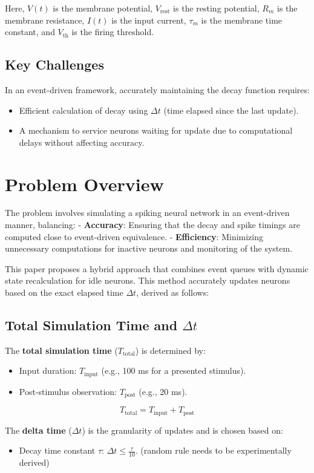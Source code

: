 \documentclass[journal]{IEEEtran}
\begin{document}
Here, $V(t)$ is the membrane potential, $V_{\text{rest}}$ is the resting potential, $R_m$ is the membrane resistance, $I(t)$ is the input current, $\tau_m$ is the membrane time constant, and $V_{\text{th}}$ is the firing threshold.

\subsection{Key Challenges}
In an event-driven framework, accurately maintaining the decay function requires:
\begin{itemize}
    \item Efficient calculation of decay using $\Delta t$ (time elapsed since the last update).
    \item A mechanism to service neurons waiting for update due to computational delays without affecting accuracy.
\end{itemize}

\section{Problem Overview}
The problem involves simulating a spiking neural network in an event-driven manner, balancing:
- \textbf{Accuracy}: Ensuring that the decay and spike timings are computed close to event-driven equivalence.
- \textbf{Efficiency}: Minimizing unnecessary computations for inactive neurons and monitoring of the system.

This paper proposes a hybrid approach that combines event queues with dynamic state recalculation for idle neurons. This method accurately updates neurons based on the exact elapsed time $\Delta t$, derived as follows:

\subsection{Total Simulation Time and $\Delta t$}

The \textbf{total simulation time} ($T_{\text{total}}$) is determined by:
\begin{itemize}
    \item Input duration: $T_{\text{input}}$ (e.g., 100 ms for a presented stimulus).
    \item Post-stimulus observation: $T_{\text{post}}$ (e.g., 20 ms).
\end{itemize}
\[
T_{\text{total}} = T_{\text{input}} + T_{\text{post}}
\]

The \textbf{delta time} ($\Delta t$) is the granularity of updates and is chosen based on:
\begin{itemize}
    \item Decay time constant $\tau$: $\Delta t \leq \frac{\tau}{10}$. (random rule needs to be experimentally derived)
\end{itemize}
\end{document}

